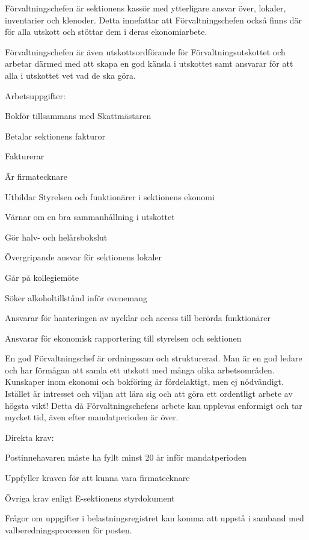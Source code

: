 \documentclass[10pt]{article}
\def\post{Förvaltningschef}
\def\doctitle{Kravprofil för \post}
\begin{document}
\heading{\doctitle}

Förvaltningschefen är sektionens kassör med ytterligare ansvar över, lokaler, inventarier och klenoder. Detta innefattar att Förvaltningschefen också finns där för alla utskott och stöttar dem i deras ekonomiarbete.

Förvaltningschefen är även utskottsordförande för Förvaltningsutskottet och arbetar därmed med att skapa en god känsla i utskottet samt ansvarar för att alla i utskottet vet vad de ska göra.



Arbetsuppgifter:
\begin{dashlist}
	\item Bokför tillsammans med Skattmästaren
	\item Betalar sektionens fakturor
	\item Fakturerar
	\item Är firmatecknare
	\item Utbildar Styrelsen och funktionärer i sektionens ekonomi
	\item Värnar om en bra sammanhållning i utskottet
	\item Gör halv- och helårsbokslut
	\item Övergripande ansvar för sektionens lokaler
	\item Går på kollegiemöte
	\item Söker alkoholtillstånd inför evenemang
	\item Ansvarar för hanteringen av nycklar och access till berörda funktionärer
	\item Ansvarar för ekonomisk rapportering till styrelsen och sektionen
\end{dashlist}

En god Förvaltningschef är ordningssam och strukturerad. Man är en god ledare och har förmågan att samla ett utskott med många olika arbetsområden.
Kunskaper inom ekonomi och bokföring är fördelaktigt, men ej nödvändigt. Istället är intresset och viljan att lära sig och att göra ett ordentligt arbete av högsta vikt! Detta då Förvaltningschefens arbete kan upplevas enformigt och tar mycket tid, även efter mandatperioden är över.

Direkta krav:
\begin{dashlist}
	\item Postinnehavaren måste ha fyllt minst 20 år inför mandatperioden
	\item Uppfyller kraven för att kunna vara firmatecknare
	\item Övriga krav enligt E-sektionens styrdokument
\end{dashlist}

Frågor om uppgifter i belastningsregistret kan komma att uppstå i samband med valberedningsprocessen för posten.
\end{document}
